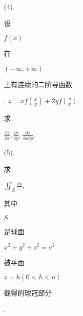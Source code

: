 \documentclass[10pt]{article}
\begin{document}
(4). \begin{CJK}{UTF8}{mj}设\end{CJK} $f(x)$ \begin{CJK}{UTF8}{mj}在\end{CJK} $(-\infty,+\infty)$ \begin{CJK}{UTF8}{mj}上有连续的二阶导函数\end{CJK}, $z=x f\left(\frac{x}{y}\right)+2 y f\left(\frac{y}{x}\right)$. \begin{CJK}{UTF8}{mj}求\end{CJK} $\frac{\partial z}{\partial x}, \frac{\partial z}{\partial y}, \frac{\partial z}{\partial x \partial y}$.

(5). \begin{CJK}{UTF8}{mj}求\end{CJK} $\iint_{S} \frac{\mathrm{d} s}{z}$, \begin{CJK}{UTF8}{mj}其中\end{CJK} $S$ \begin{CJK}{UTF8}{mj}是球面\end{CJK} $x^{2}+y^{2}+z^{2}=a^{2}$ \begin{CJK}{UTF8}{mj}被平面\end{CJK} $z=h(0<h<a)$ \begin{CJK}{UTF8}{mj}截得的球冠部分\end{CJK}.
\end{document}
